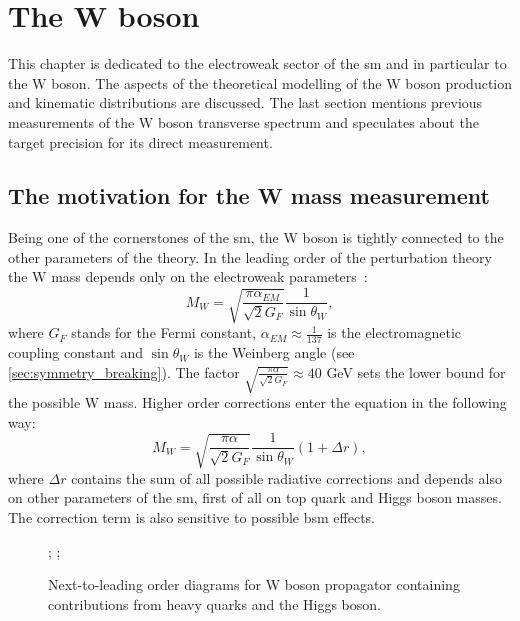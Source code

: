 \chapter{The W boson}
    This chapter is dedicated to the electroweak sector of the \gls{sm} and in particular to the W boson. The aspects of the theoretical modelling of the W boson production and kinematic distributions are discussed. The last section mentions previous measurements of the W boson transverse spectrum and speculates about the target precision for its direct measurement. 
    	\section{The motivation for the W mass measurement}    
        Being one of the cornerstones of the \gls{sm}, the W boson is tightly connected to the other parameters of the theory. In the leading order of the perturbation theory the W mass depends only on the electroweak parameters~\cite{Awramik}:
        \begin{equation}
        M_W=\sqrt{\frac{\pi \alpha_{EM}}{\sqrt{2}G_F}}\frac{1}{\sin{\theta_W}},
        \end{equation}
        where $G_F$ stands for the Fermi constant, $\alpha_{EM}\approx\frac{1}{137}$ is the electromagnetic coupling constant and $\sin{\theta_W}$ is the Weinberg angle (see \ref{sec:symmetry_breaking}). The factor $\sqrt{\frac{\pi \alpha}{\sqrt{2}G_F}} \approx 40$ GeV sets the lower bound for the possible W mass. Higher order corrections enter the equation in the following way:
        \begin{equation}
        M_W=\sqrt{\frac{\pi \alpha}{\sqrt{2}G_F}}\frac{1}{\sin{\theta_W}}(1+\Delta r),
        \end{equation}
        where $\Delta r $ contains the sum of all possible radiative corrections and depends also on other parameters of the \gls{sm}, first of all on top quark and Higgs boson masses. The correction term is also sensitive to possible \gls{bsm} effects.
        \begin{figure}
        	\label{fig::mw_cor}
        	\centering
        	;
        		\;  \; \; \; 
        	;
        	\caption{ Next-to-leading order diagrams for W boson propagator containing contributions from heavy quarks and the Higgs boson.}
        \end{figure}
